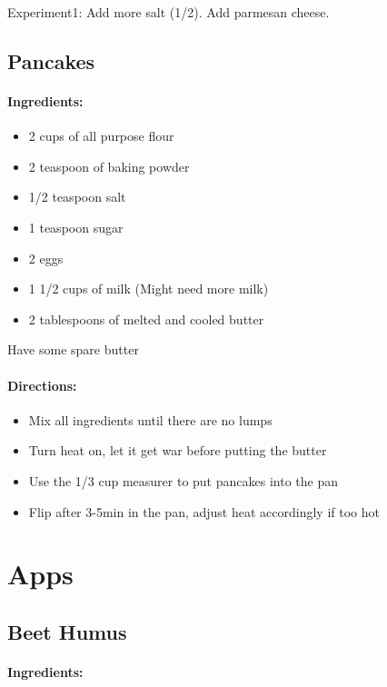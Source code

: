 \documentclass{article}
\begin{document}
Experiment1: Add more salt (1/2). Add parmesan cheese.

\subsection{Pancakes}

\paragraph{Ingredients:}

\begin{itemize}
	\item 2 cups of all purpose flour 
	\item 2 teaspoon of baking powder 
	\item 1/2 teaspoon salt 
	\item 1 teaspoon sugar 
	\item 2 eggs 
	\item 1 1/2 cups of milk (Might need more milk)
	\item 2 tablespoons of melted and cooled butter
\end{itemize}

Have some spare butter

\paragraph{Directions:}
\begin{itemize}
	\item Mix all ingredients until there are no lumps 
	\item Turn heat on, let it get war before putting the butter 
	\item Use the 1/3 cup measurer to put pancakes into the pan 
	\item Flip after 3-5min in the pan, adjust heat accordingly if too hot
\end{itemize}

\section{Apps}

\subsection{Beet Humus}

\paragraph{Ingredients:}
\end{document}
